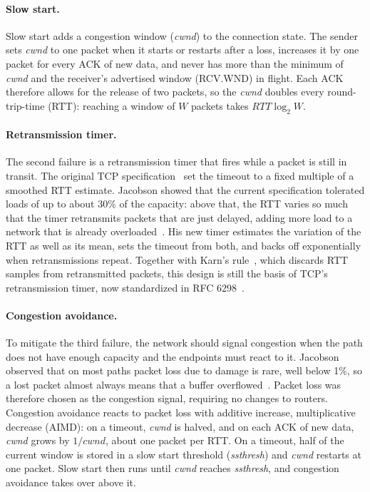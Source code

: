 \paragraph{Slow start.} Slow start adds a congestion window (\textit{cwnd}) to the
connection state. The sender sets \textit{cwnd} to one packet when it starts or
restarts after a loss, increases it by one packet for every ACK of new data, and
never has more than the minimum of \textit{cwnd} and the receiver's advertised
window (RCV.WND) in flight. Each ACK therefore allows for the release of two packets, so the \textit{cwnd}
doubles every round-trip-time (RTT): reaching a window of $W$ packets takes $RTT\log_2 W$.

\paragraph{Retransmission timer.} The second failure is a retransmission timer that
fires while a packet is still in transit. The original TCP specification~\cite{rfc793} set the
timeout to a fixed multiple of a smoothed RTT estimate. Jacobson
showed that the current specification tolerated loads of up to about
30\% of the capacity: above that, the RTT varies so much that the timer retransmits packets that
are just delayed, adding more load to a network that is already
overloaded~\cite{jacobson1988congestion}. His new timer estimates the variation of the
RTT as well as its mean, sets the timeout from both, and backs off exponentially
when retransmissions repeat. Together with Karn's rule~\cite{karn1987improving}, which discards RTT samples
from retransmitted packets, this design is still the basis
of TCP's retransmission timer, now standardized in RFC 6298~\cite{rfc6298}.

\paragraph{Congestion avoidance.} To mitigate the third failure, the network should signal congestion when the path does not have enough capacity and the endpoints must react to it. Jacobson observed that on most paths packet loss due to damage is
rare, well below 1\%, so a lost packet almost always means that a buffer
overflowed~\cite{jacobson1988congestion}. Packet loss was therefore chosen as the congestion signal, requiring no changes to routers. Congestion avoidance reacts to packet loss with
additive increase, multiplicative decrease (AIMD): on a timeout,
\textit{cwnd} is halved, and on each ACK of new data, \textit{cwnd} grows by
$1/\textit{cwnd}$, about one packet per RTT. On a timeout, half of the current window is stored in a slow start
threshold (\textit{ssthresh}) and \textit{cwnd} restarts at one packet. Slow start
then runs until \textit{cwnd} reaches \textit{ssthresh}, and congestion avoidance
takes over above it.

